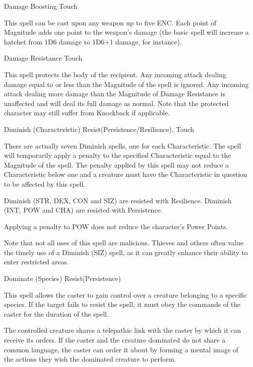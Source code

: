 \begin{rpg-spell}
{Damage Boosting}
{Touch}

This spell can be cast upon any weapon up to five ENC. Each point of Magnitude adds one point to the weapon’s damage (the basic spell will increase a hatchet from 1D6 damage to 1D6+1 damage, for instance). 
\end{rpg-spell}


\begin{rpg-spell}
{Damage Resistance}
{Touch}

This spell protects the body of the recipient. Any incoming attack dealing damage equal to or less than the Magnitude of the spell is ignored. Any incoming attack dealing more damage than the Magnitude of Damage Resistance is unaffected and will deal its full damage as normal. Note that the protected character may still suffer from Knockback if applicable. 
\end{rpg-spell}


\begin{rpg-spell}
{Diminish (Characteristic)}
{Resist(Persistence/Resilience), Touch}

There are actually seven Diminish spells, one for each Characteristic. The spell will temporarily apply a penalty to the specified Characteristic equal to the Magnitude of the spell. The penalty applied by this spell may not reduce a Characteristic below one and a creature must have the Characteristic in question to be affected by this spell. 

Diminish (STR, DEX, CON and SIZ) are resisted with Resilience. Diminish (INT, POW and CHA) are resisted with Persistence. 

Applying a penalty to POW does not reduce the character’s Power Points.

Note that not all uses of this spell are malicious. Thieves and others often value the timely use of a Diminish (SIZ) spell, as it can greatly enhance their ability to enter restricted areas. 
\end{rpg-spell}


\begin{rpg-spell}
{Dominate (Species)}
{Resist(Persistence)}

This spell allows the caster to gain control over a creature belonging to a specific species. If the target fails to resist the spell, it must obey the commands of the caster for the duration of the spell. 

The controlled creature shares a telepathic link with the caster by which it can receive its orders. If the caster and the creature dominated do not share a common language, the caster can order it about by forming a mental image of the actions they wish the dominated creature to perform.
\end{rpg-spell}


